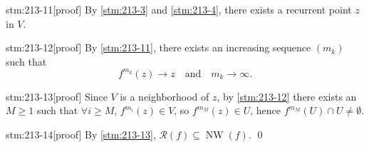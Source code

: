 \documentclass{article}
\begin{document}
\begin{stm}{stm:213-11}[proof]
By \ref{stm:213-3} and \ref{stm:213-4}, there exists a recurrent point $z$ in $V$.
\end{stm}

\begin{stm}{stm:213-12}[proof]
By \ref{stm:213-11}, there exists an increasing sequence $(m_k)$ such that 
\[
f^{m_k}(z) \to z \quad \text{and} \quad m_k \to \infty.
\]
\end{stm}

\begin{stm}{stm:213-13}[proof]
Since $V$ is a neighborhood of $z$, by \ref{stm:213-12} there exists an $M \geq 1$ such that $\forall i \geq M$, $f^{m_i}(z) \in V$, so $f^{m_M}(z) \in U$, hence $f^{m_M}(U) \cap U \neq \emptyset$.
\end{stm}

\begin{stm}{stm:213-14}[proof]
By \ref{stm:213-13}, $\mathcal{R}(f) \subseteq \operatorname{NW}(f)$. \qed
\end{stm}
\end{document}
